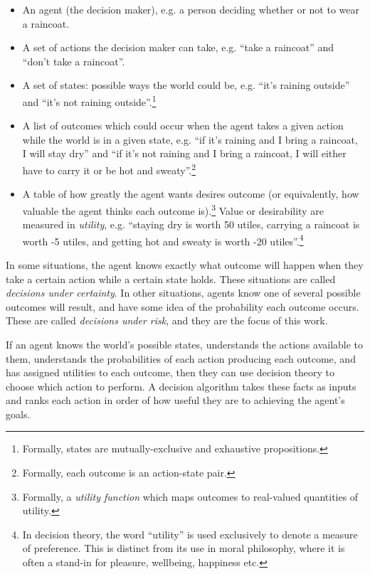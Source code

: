 \documentclass{article}
\begin{document}
\begin{itemize}  
\item An agent (the decision maker), e.g. a person deciding whether or not to wear a raincoat.
\item A set of actions the decision maker can take, e.g. ``take a raincoat'' and ``don't take a raincoat''.
\item A set of states: possible ways the world could be, e.g. ``it's raining outside'' and ``it's not raining outside''.\footnote{Formally, states are mutually-exclusive and exhaustive propositions.}
\item A list of outcomes which could occur when the agent takes a given action while the world is in a given state, e.g. ``if it's raining and I bring a raincoat, I will stay dry'' and ``if it's not raining and I bring a raincoat, I will either have to carry it or be hot and sweaty''.\footnote{Formally, each outcome is an action-state pair.}
\item A table of how greatly the agent wants desires outcome (or equivalently, how valuable the agent thinks each outcome is).\footnote{Formally, a \textit{utility function} which maps outcomes to real-valued quantities of utility.} Value or desirability are measured in \textit{utility}, e.g. ``staying dry is worth 50 utiles, carrying a raincoat is worth -5 utiles, and getting hot and sweaty is worth -20 utiles''.\footnote{In decision theory, the word ``utility'' is used exclusively to denote a measure of preference. This is distinct from its use in moral philosophy, where it is often a stand-in for pleasure, wellbeing, happiness etc.}
\end{itemize}

In some situations, the agent knows exactly what outcome will happen when they take a certain action while a certain state holds. These situations are called \textit{decisions under certainty}. In other situations, agents know one of several possible outcomes will result, and have some idea of the probability each outcome occurs. These are called \textit{decisions under risk}, and they are the focus of this work.

If an agent knows the world's possible states, understands the actions available to them, understands the probabilities of each action producing each outcome, and has assigned utilities to each outcome, then they can use decision theory to choose which action to perform. A decision algorithm takes these facts as inputs and ranks each action in order of how useful they are to achieving the agent's goals. 
\end{document}
